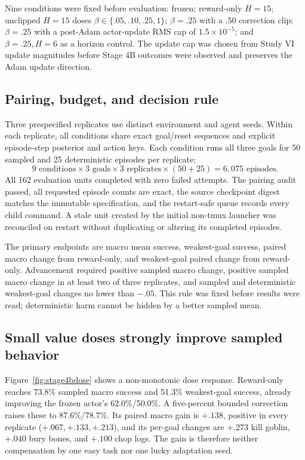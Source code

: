 \documentclass[10pt]{article}
\newcommand{\pct}[1]{#1\%}
\begin{document}
Nine conditions were fixed before evaluation: frozen; reward-only $H=15$;
unclipped $H=15$ doses $\beta\in\{.05,.10,.25,1\}$; $\beta=.25$ with a .50
correction clip; $\beta=.25$ with a post-Adam actor-update RMS cap of
$1.5\times10^{-5}$; and $\beta=.25,H=6$ as a horizon control. The update cap
was chosen from Study VI update magnitudes before Stage 4B outcomes were
observed and preserves the Adam update direction.

\subsection{Pairing, budget, and decision rule}

Three prespecified replicates use distinct environment and agent seeds. Within
each replicate, all conditions share exact goal/reset sequences and explicit
episode-step posterior and action keys. Each condition runs all three goals
for 50 sampled and 25 deterministic episodes per replicate:
\begin{equation}
 9\text{ conditions}\times3\text{ goals}\times3\text{ replicates}
 \times(50+25)=6{,}075\text{ episodes}.
\end{equation}
All 162 evaluation units completed with zero failed attempts. The pairing audit
passed, all requested episode counts are exact, the source checkpoint digest
matches the immutable specification, and the restart-safe queue records every
child command. A stale unit created by the initial non-tmux launcher was
reconciled on restart without duplicating or altering its completed episodes.

The primary endpoints are macro mean success, weakest-goal success, paired
macro change from reward-only, and weakest-goal paired change from reward-only.
Advancement required positive sampled macro change, positive sampled macro
change in at least two of three replicates, and sampled and deterministic
weakest-goal changes no lower than $-.05$. This rule was fixed before results
were read; deterministic harm cannot be hidden by a better sampled mean.

\subsection{Small value doses strongly improve sampled behavior}

Figure~\ref{fig:stage4bdose} shows a non-monotonic dose response. Reward-only
reaches \pct{73.8} sampled macro success and \pct{51.3} weakest-goal success,
already improving the frozen actor's \pct{62.0}/\pct{50.0}. A five-percent
bounded correction raises these to \pct{87.6}/\pct{78.7}. Its paired macro
gain is $+.138$, positive in every replicate ($+.067,+.133,+.213$), and its
per-goal changes are $+.273$ kill goblin, $+.040$ bury bones, and $+.100$ chop
logs. The gain is therefore neither compensation by one easy task nor one
lucky adaptation seed.
\end{document}
